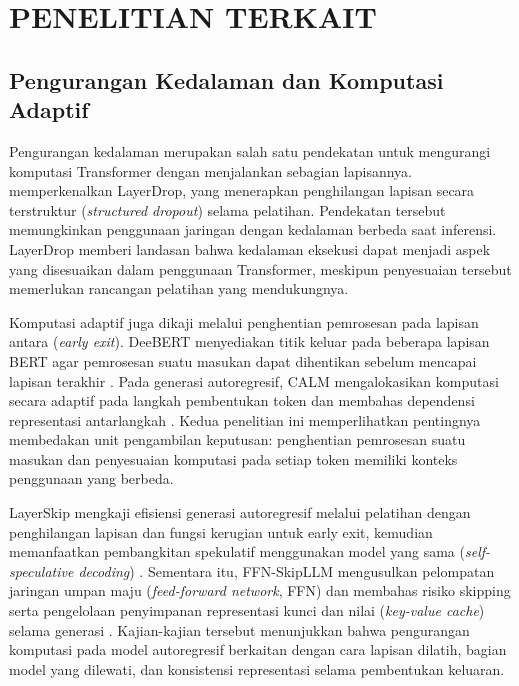 \chapter{PENELITIAN TERKAIT}

\section{Pengurangan Kedalaman dan Komputasi Adaptif}

Pengurangan kedalaman merupakan salah satu pendekatan untuk mengurangi komputasi Transformer dengan menjalankan sebagian lapisannya. \citet{fan2020layerdrop} memperkenalkan LayerDrop, yang menerapkan penghilangan lapisan secara terstruktur (\textit{structured dropout}) selama pelatihan. Pendekatan tersebut memungkinkan penggunaan jaringan dengan kedalaman berbeda saat inferensi. LayerDrop memberi landasan bahwa kedalaman eksekusi dapat menjadi aspek yang disesuaikan dalam penggunaan Transformer, meskipun penyesuaian tersebut memerlukan rancangan pelatihan yang mendukungnya.

Komputasi adaptif juga dikaji melalui penghentian pemrosesan pada lapisan antara (\textit{early exit}). DeeBERT menyediakan titik keluar pada beberapa lapisan BERT agar pemrosesan suatu masukan dapat dihentikan sebelum mencapai lapisan terakhir \citep{xin2020deebert}. Pada generasi autoregresif, CALM mengalokasikan komputasi secara adaptif pada langkah pembentukan token dan membahas dependensi representasi antarlangkah \citep{schuster2022calm}. Kedua penelitian ini memperlihatkan pentingnya membedakan unit pengambilan keputusan: penghentian pemrosesan suatu masukan dan penyesuaian komputasi pada setiap token memiliki konteks penggunaan yang berbeda.

LayerSkip mengkaji efisiensi generasi autoregresif melalui pelatihan dengan penghilangan lapisan dan fungsi kerugian untuk early exit, kemudian memanfaatkan pembangkitan spekulatif menggunakan model yang sama (\textit{self-speculative decoding}) \citep{elhoushi2024layerskip}. Sementara itu, FFN-SkipLLM mengusulkan pelompatan jaringan umpan maju (\textit{feed-forward network}, FFN) dan membahas risiko skipping serta pengelolaan penyimpanan representasi kunci dan nilai (\textit{key-value cache}) selama generasi \citep{jaiswal2024ffnskip}. Kajian-kajian tersebut menunjukkan bahwa pengurangan komputasi pada model autoregresif berkaitan dengan cara lapisan dilatih, bagian model yang dilewati, dan konsistensi representasi selama pembentukan keluaran.

